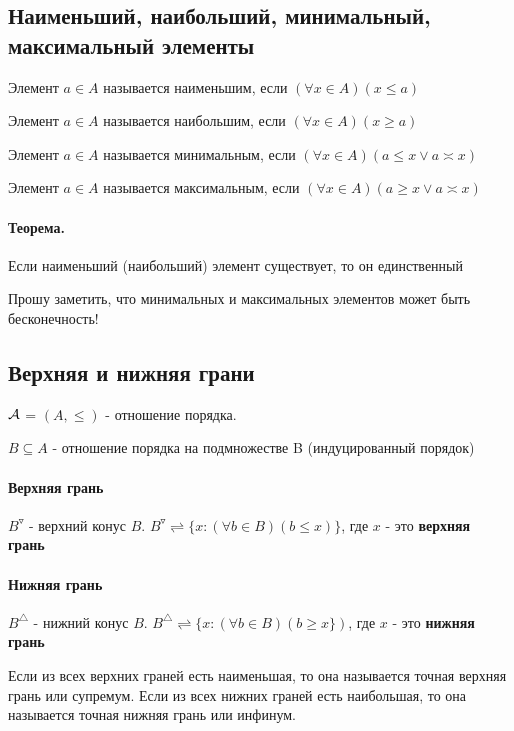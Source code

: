 \documentclass{report}
\begin{document}
\subsection{Наименьший, наибольший,\newline
	минимальный, максимальный элементы}
Элемент $a \in A$ называется наименьшим, если
$(\forall x \in A)(x \leq a)$

Элемент $a \in A$ называется наибольшим, если
$(\forall x \in A)(x \geq a)$


\medskip

Элемент $a \in A$ называется минимальным, если
$(\forall x \in A)(a \leq x \lor a \asymp x)$

Элемент $a \in A$ называется максимальным, если
$(\forall x \in A)(a \geq x \lor a \asymp x)$

\paragraph*{Теорема.}
Если наименьший (наибольший) элемент существует, то он единственный

\medskip

Прошу заметить, что минимальных и максимальных элементов может быть бесконечность!

\subsection{Верхняя и нижняя грани}
$\cal A$ = $(A, \leq)$ - отношение порядка.

$B \subseteq A$ - отношение порядка на подмножестве B (индуцированный порядок)

\paragraph*{Верхняя грань}
$B^{\triangledown}$ - верхний конус $B$.
$B^{\triangledown} \rightleftharpoons \{x: (\forall b \in B)(b \leq x)\}$, где $x$ - это \textbf{верхняя грань}

\paragraph*{Нижняя грань}
$B^{\triangle}$ - нижний конус $B$.
$B^{\triangle} \rightleftharpoons \{x: (\forall b \in B)(b \geq x\})$, где $x$ - это \textbf{нижняя грань}


Если из всех верхних граней есть наименьшая, то она называется точная верхняя грань или супремум.
Если из всех нижних граней есть наибольшая, то она называется точная нижняя грань или инфинум.
\end{document}
